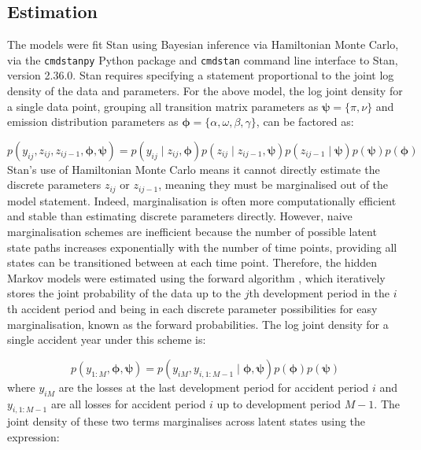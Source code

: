 \subsection{Estimation}
The models were fit Stan \citep{stan2017} using Bayesian inference
via Hamiltonian Monte Carlo, via the \texttt{cmdstanpy} \citep{cmdstanpy2024} 
Python package and \texttt{cmdstan} \citep{cmdstan2024}
command line interface to Stan, version 2.36.0.
Stan requires specifying a statement
proportional to the joint log density of the data and parameters.
For the above model, the log joint density for a single data point,
grouping all transition matrix parameters as $\bm{\psi} = \{\pi, \nu\}$
and emission distribution parameters as $\bm{\phi} = \{\alpha,
\omega, \beta, \gamma\}$, can be factored as:

\begin{equation}
p(y_{ij}, z_{ij}, z_{ij-1}, \bm{\phi}, \bm{\psi}) = 
    p(y_{ij} \mid  z_{ij}, \bm{\phi})
    p(z_{ij} \mid z_{ij-1}, \bm{\psi})
    p(z_{ij-1} \mid \bm{\psi})
    p(\bm{\psi})
    p(\bm{\phi})
\end{equation}
%
Stan's use of Hamiltonian Monte Carlo means it cannot
directly estimate the discrete parameters 
$z_{ij}$ or $z_{ij-1}$, meaning they
must be marginalised out of the model statement.
Indeed, marginalisation is often more computationally
efficient and stable than estimating discrete parameters
directly.
However, naive marginalisation schemes are inefficient
because the number of possible latent state paths increases
exponentially with the number of time points,
providing all states can be transitioned between
at each time point. Therefore, the hidden Markov
models were estimated using the forward algorithm
\citep{rabiner1989},
which iteratively stores the joint probability
of the data up to the $j$th development period
in the $i$th accident period and 
being in each discrete parameter possibilities
for easy marginalisation, known as the forward
probabilities. 
The log joint density for a single accident year under
this scheme is:

\begin{equation}
    p(y_{1:M}, \bm{\phi}, \bm{\psi}) = p(y_{iM}, y_{i,1:M-1} \mid \bm{\phi}, \bm{\psi})
    p(\bm{\phi}) p(\bm{\psi})
\end{equation}
%
where $y_{iM}$ are the losses at the
last development period for accident period $i$
and $y_{i,1:M-1}$ are all losses for accident period $i$ up to 
development period $M - 1$. The joint
density of these two terms marginalises
across latent states using the expression:

